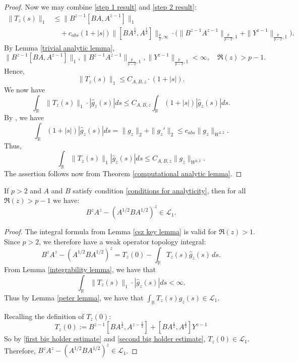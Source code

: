 \begin{proof}
        Now we may combine \eqref{step 1 result} and \eqref{step 2 result}:
        \begin{align*}
            \|T_z(s)\|_1 &\leq \|B^{z-1}[BA,A^{z-1}]\|_1\\
                         &\quad +c_{abs}(1+|s|)\|[BA^{\frac12},A^{\frac12}]\|_{\frac{p}{2},\infty}\cdot\Big(\|B^{z-1}A^{z-1}\|_{\frac{p}{p-2},1}+\|Y^{z-1}\|_{\frac{p}{p-2},1}\Big).
        \end{align*}
        By Lemma \ref{trivial analytic lemma},
        \begin{equation*}
            \|B^{z-1}[BA,A^{z-1}]\|_1,\|B^{z-1}A^{z-1}\|_{\frac{p}{p-2},1},\|Y^{z-1}\|_{\frac{p}{p-2},1}<\infty,\quad\Re(z)>p-1.
        \end{equation*}
        Hence,
        $$\|T_z(s)\|_1\leq C_{A,B,z}\cdot (1+|s|).$$
        We now have
        $$\int_{\mathbb{R}}\|T_z(s)\|_1\cdot |\hat{g}_z(s)|ds\leq C_{A,B,z}\int_{\mathbb{R}}(1+|s|)|\hat{g}_z(s)|ds.$$
        By \cite[Lemma 7]{PS-crelle}, we have
        $$\int_{\mathbb{R}}(1+|s|)|\hat{g}_z(s)|ds=\|g_z\|_2+\|g_z'\|_2\leq c_{abs}\|g_z\|_{W^{2,2}}.$$
        Thus,
        $$\int_{\mathbb{R}}\|T_z(s)\|_1 |\hat{g}_z(s)|ds\leq C_{A,B,z}\|g_z\|_{W^{2,2}}.$$
        The assertion follows now from Theorem \ref{computational analytic lemma}.
    \end{proof}
    
    \begin{cor}\label{difference is trace class}
        If $p > 2$ and $A$ and $B$ satisfy condition \ref{conditions for analyticity}, then for all $\Re(z) > p-1$ we have:
        \begin{equation*}
            B^zA^z-(A^{1/2}BA^{1/2})^z \in \mathcal{L}_1.
        \end{equation*}
    \end{cor}
    \begin{proof}
        The integral formula from Lemma \ref{csz key lemma} is valid for $\Re(z) > 1$. Since $p > 2$, we therefore have a weak operator topology integral:
        \begin{equation*}
            B^zA^z-(A^{1/2}BA^{1/2})^z = T_z(0)-\int_{\mathbb{R}} T_z(s)\widehat{g}_z(s)\,ds.
        \end{equation*}
        From Lemma \ref{integrability lemma}, we have that $$\int_{\mathbb{R}}\|T_z(s)\|_1\cdot |\hat{g}_z(s)|ds<\infty.$$
        Thus by Lemma \ref{peter lemma}, we have that $\int_{\mathbb{R}} T_z(s)\widehat{g}_z(s) \in \mathcal{L}_1$. 
        
        Recalling the definition of $T_z(0)$:
        \begin{equation*}
            T_z(0) := B^{z-1}[BA^{\frac{1}{2}},A^{z-\frac{1}{2}}]+[BA^{\frac{1}{2}},A^{\frac{1}{2}}]Y^{z-1}
        \end{equation*}
        So by \eqref{first big holder estimate} and \eqref{second big holder estimate}, $T_z(0) \in \mathcal{L}_1$. Therefore, $B^zA^z-(A^{1/2}BA^{1/2})^z \in \mathcal{L}_1$.
    \end{proof}


